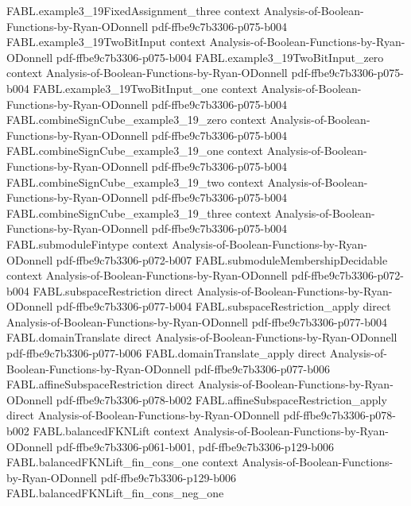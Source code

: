 \begin{theorem}
\proofstep
  {FABL.example3_19FixedAssignment_three}
  {context}
  {Analysis-of-Boolean-Functions-by-Ryan-ODonnell}
  {pdf-ffbe9c7b3306-p075-b004}
\proofstep
  {FABL.example3_19TwoBitInput}
  {context}
  {Analysis-of-Boolean-Functions-by-Ryan-ODonnell}
  {pdf-ffbe9c7b3306-p075-b004}
\proofstep
  {FABL.example3_19TwoBitInput_zero}
  {context}
  {Analysis-of-Boolean-Functions-by-Ryan-ODonnell}
  {pdf-ffbe9c7b3306-p075-b004}
\proofstep
  {FABL.example3_19TwoBitInput_one}
  {context}
  {Analysis-of-Boolean-Functions-by-Ryan-ODonnell}
  {pdf-ffbe9c7b3306-p075-b004}
\proofstep
  {FABL.combineSignCube_example3_19_zero}
  {context}
  {Analysis-of-Boolean-Functions-by-Ryan-ODonnell}
  {pdf-ffbe9c7b3306-p075-b004}
\proofstep
  {FABL.combineSignCube_example3_19_one}
  {context}
  {Analysis-of-Boolean-Functions-by-Ryan-ODonnell}
  {pdf-ffbe9c7b3306-p075-b004}
\proofstep
  {FABL.combineSignCube_example3_19_two}
  {context}
  {Analysis-of-Boolean-Functions-by-Ryan-ODonnell}
  {pdf-ffbe9c7b3306-p075-b004}
\proofstep
  {FABL.combineSignCube_example3_19_three}
  {context}
  {Analysis-of-Boolean-Functions-by-Ryan-ODonnell}
  {pdf-ffbe9c7b3306-p075-b004}
\proofstep
  {FABL.submoduleFintype}
  {context}
  {Analysis-of-Boolean-Functions-by-Ryan-ODonnell}
  {pdf-ffbe9c7b3306-p072-b007}
\proofstep
  {FABL.submoduleMembershipDecidable}
  {context}
  {Analysis-of-Boolean-Functions-by-Ryan-ODonnell}
  {pdf-ffbe9c7b3306-p072-b004}
\proofstep
  {FABL.subspaceRestriction}
  {direct}
  {Analysis-of-Boolean-Functions-by-Ryan-ODonnell}
  {pdf-ffbe9c7b3306-p077-b004}
\proofstep
  {FABL.subspaceRestriction_apply}
  {direct}
  {Analysis-of-Boolean-Functions-by-Ryan-ODonnell}
  {pdf-ffbe9c7b3306-p077-b004}
\proofstep
  {FABL.domainTranslate}
  {direct}
  {Analysis-of-Boolean-Functions-by-Ryan-ODonnell}
  {pdf-ffbe9c7b3306-p077-b006}
\proofstep
  {FABL.domainTranslate_apply}
  {direct}
  {Analysis-of-Boolean-Functions-by-Ryan-ODonnell}
  {pdf-ffbe9c7b3306-p077-b006}
\proofstep
  {FABL.affineSubspaceRestriction}
  {direct}
  {Analysis-of-Boolean-Functions-by-Ryan-ODonnell}
  {pdf-ffbe9c7b3306-p078-b002}
\proofstep
  {FABL.affineSubspaceRestriction_apply}
  {direct}
  {Analysis-of-Boolean-Functions-by-Ryan-ODonnell}
  {pdf-ffbe9c7b3306-p078-b002}
\proofstep
  {FABL.balancedFKNLift}
  {context}
  {Analysis-of-Boolean-Functions-by-Ryan-ODonnell}
  {pdf-ffbe9c7b3306-p061-b001,
    pdf-ffbe9c7b3306-p129-b006}
\proofstep
  {FABL.balancedFKNLift_fin_cons_one}
  {context}
  {Analysis-of-Boolean-Functions-by-Ryan-ODonnell}
  {pdf-ffbe9c7b3306-p129-b006}
\proofstep
  {FABL.balancedFKNLift_fin_cons_neg_one}

\end{theorem}
